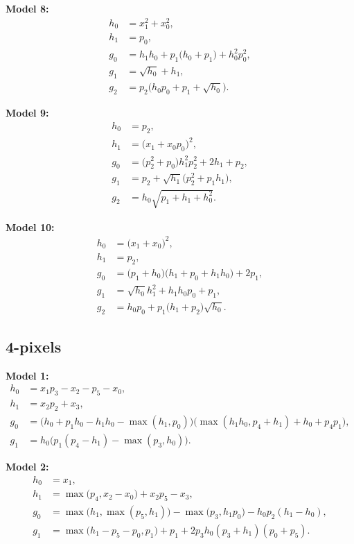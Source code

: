 \documentclass[14pt]{extarticle}
\begin{document}
    \textbf{Model 8:}
    \begin{align*}
    h_0 &= x_1^2 + x_0^2,\\
    h_1 &= p_0,\\
    g_0 &= h_1h_0 + p_1\bigl(h_0 + p_1\bigr) + h_0^2p_0^2,\\
    g_1 &= \sqrt{h_0} + h_1,\\
    g_2 &= p_2\bigl(h_0p_0 + p_1 + \sqrt{h_0}\bigr).
    \end{align*}
    
    \textbf{Model 9:}
    \begin{align*}
    h_0 &= p_2,\\
    h_1 &= \bigl(x_1 + x_0p_0\bigr)^2,\\
    g_0 &= \bigl(p_2^2 + p_0\bigr)h_1^2p_2^2 + 2h_1 + p_2,\\
    g_1 &= p_2 + \sqrt{h_1}\bigl(p_2^2 + p_1h_1\bigr),\\
    g_2 &= h_0\sqrt{p_1 + h_1 + h_0^2}.
    \end{align*}
    
    \textbf{Model 10:}
    \begin{align*}
    h_0 &= \bigl(x_1 + x_0\bigr)^2,\\
    h_1 &= p_2,\\
    g_0 &= \bigl(p_1 + h_0\bigr)\bigl(h_1 + p_0 + h_1h_0\bigr) + 2p_1,\\
    g_1 &= \sqrt{h_0}h_1^2 + h_1h_0p_0 + p_1,\\
    g_2 &= h_0p_0 + p_1\bigl(h_1 + p_2\bigr)\sqrt{h_0}.
    \end{align*}
    
    \subsection{4-pixels}
    
    \textbf{Model 1:}
    \begin{align*}
    h_0 &= x_1p_3 -x_2  - p_5 - x_0,\\
    h_1 &= x_2 p_2 + x_3,\\
    g_0 &= \bigl(h_0 + p_1h_0 - h_1h_0 - \max(h_1,p_0)\bigr)\bigl(\max(h_1h_0,p_4 + h_1) + h_0 + p_4p_1\bigr),\\
    g_1 &= h_0\bigl(p_1(p_4 - h_1) - \max(p_3,h_0)\bigr).
    \end{align*}
    
    \textbf{Model 2:}
    \begin{align*}
    h_0 &= x_1,\\
    h_1 &= \max\bigl(p_4,x_2 - x_0\bigr) + x_2p_5 - x_3,\\
    g_0 &= \max\bigl(h_1,\max(p_5,h_1)\bigr) - \max\bigl(p_3, h_1 p_0\bigr) - h_0 p_2(h_1 - h_0),\\
    g_1 &= \max\bigl(h_1 - p_5 - p_0,p_1\bigr) + p_1 + 2p_3h_0(p_3 + h_1)(p_0 + p_5).
    \end{align*}
    
\end{document}
